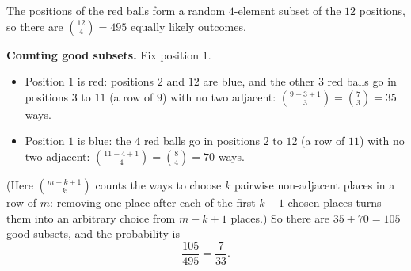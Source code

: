 The positions of the red balls form a random $4$-element subset of the $12$ positions, so there are $\binom{12}{4}=495$ equally likely outcomes.

\textbf{Counting good subsets.} Fix position $1$.
\begin{itemize}
\item Position $1$ is red: positions $2$ and $12$ are blue, and the other $3$ red balls go in positions $3$ to $11$ (a row of $9$) with no two adjacent: $\binom{9-3+1}{3}=\binom73=35$ ways.
\item Position $1$ is blue: the $4$ red balls go in positions $2$ to $12$ (a row of $11$) with no two adjacent: $\binom{11-4+1}{4}=\binom84=70$ ways.
\end{itemize}
(Here $\binom{m-k+1}{k}$ counts the ways to choose $k$ pairwise non-adjacent places in a row of $m$: removing one place after each of the first $k-1$ chosen places turns them into an arbitrary choice from $m-k+1$ places.) So there are $35+70=105$ good subsets, and the probability is
\[
\dfrac{105}{495}=\boxed{\dfrac{7}{33}}.
\]
